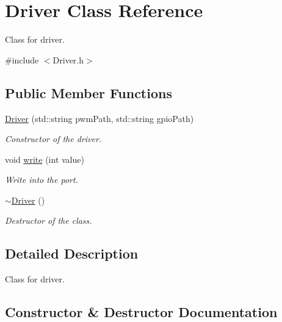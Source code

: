 \hypertarget{class_driver}{}\section{Driver Class Reference}
\label{class_driver}


Class for driver.  




{\ttfamily \#include $<$Driver.\+h$>$}

\subsection*{Public Member Functions}
\begin{DoxyCompactItemize}
\item 
\mbox{\hyperlink{class_driver_a387448dcdc1c112c97c050b964494185}{Driver}} (std\+::string pwm\+Path, std\+::string gpio\+Path)
\begin{DoxyCompactList}\small\item\em Constructor of the driver. \end{DoxyCompactList}\item 
void \mbox{\hyperlink{class_driver_aed1be55ee1916c07c81504873fab9c3a}{write}} (int value)
\begin{DoxyCompactList}\small\item\em Write into the port. \end{DoxyCompactList}\item 
\mbox{\label{class_driver_ac7645eea8d3ce2bc39ddbda5e840297a}} 
\mbox{\hyperlink{class_driver_ac7645eea8d3ce2bc39ddbda5e840297a}{$\sim$\+Driver}} ()
\begin{DoxyCompactList}\small\item\em Destructor of the class. \end{DoxyCompactList}\end{DoxyCompactItemize}


\subsection{Detailed Description}
Class for driver. 

\subsection{Constructor \& Destructor Documentation}
\mbox{\label{class_driver_a387448dcdc1c112c97c050b964494185}} 
